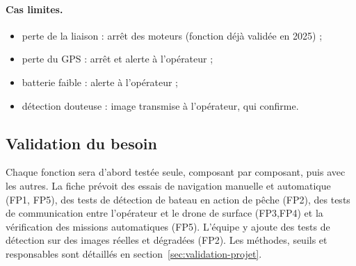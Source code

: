 \paragraph{Cas limites.} 
\begin{itemize}
  \item perte de la liaison : arrêt des moteurs (fonction déjà validée en 2025) ;
  \item perte du GPS : arrêt et alerte à l'opérateur ;
  \item batterie faible : alerte à l'opérateur ;
  \item détection douteuse : image transmise à l'opérateur, qui confirme.
  \\
\end{itemize}

\subsection{Validation du besoin}
\label{sec:validation-besoin}

Chaque fonction sera d'abord testée seule, composant par composant, puis avec les autres. La fiche prévoit des essais de navigation manuelle et automatique (FP1, FP5), des tests de détection de bateau en action de pêche (FP2), des tests de communication entre l'opérateur et le drone de surface (FP3,FP4) et la vérification des missions automatiques (FP5). L'équipe y ajoute des tests de détection sur des images réelles et dégradées (FP2). Les méthodes, seuils et responsables sont détaillés en section~\ref{sec:validation-projet}.
\\

